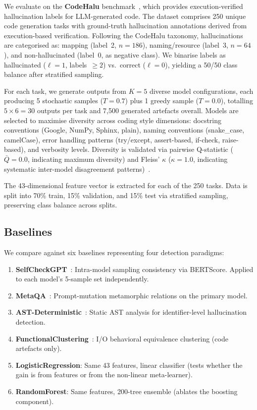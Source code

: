 \documentclass[runningheads]{llncs}
\begin{document}
We evaluate on the \textbf{CodeHalu} benchmark~\cite{tian2025codehalu}, which provides execution-verified hallucination labels for LLM-generated code. The dataset comprises 250 unique code generation tasks with ground-truth hallucination annotations derived from execution-based verification. Following the CodeHalu taxonomy, hallucinations are categorised as: mapping (label~2, $n=186$), naming/resource (label~3, $n=64$), and non-hallucinated (label~0, as negative class). We binarise labels as hallucinated ($\ell=1$, labels~$\geq 2$) vs.\ correct ($\ell=0$), yielding a 50/50 class balance after stratified sampling.

For each task, we generate outputs from $K=5$ diverse model configurations, each producing 5 stochastic samples ($T=0.7$) plus 1 greedy sample ($T=0.0$), totalling $5 \times 6 = 30$ outputs per task and 7,500 generated artefacts overall. Models are selected to maximise diversity across coding style dimensions: docstring conventions (Google, NumPy, Sphinx, plain), naming conventions (snake\_case, camelCase), error handling patterns (try/except, assert-based, if-check, raise-based), and verbosity levels. Diversity is validated via pairwise Q-statistic ($\bar{Q} = 0.0$, indicating maximum diversity) and Fleiss' $\kappa$ ($\kappa = 1.0$, indicating systematic inter-model disagreement patterns)~\cite{brown2005diversity}.

The 43-dimensional feature vector is extracted for each of the 250 tasks. Data is split into 70\% train, 15\% validation, and 15\% test via stratified sampling, preserving class balance across splits.

\subsection{Baselines}
\label{sec:baselines}

We compare against six baselines representing four detection paradigms:
\begin{enumerate}
\item \textbf{SelfCheckGPT}~\cite{manakul2023selfcheckgpt}: Intra-model sampling consistency via BERTScore. Applied to each model's 5-sample set independently.
\item \textbf{MetaQA}~\cite{yang2025metaqa}: Prompt-mutation metamorphic relations on the primary model.
\item \textbf{AST-Deterministic}~\cite{khati2026ast}: Static AST analysis for identifier-level hallucination detection.
\item \textbf{FunctionalClustering}~\cite{ravuri2025clustering}: I/O behavioral equivalence clustering (code artefacts only).
\item \textbf{LogisticRegression}: Same 43 features, linear classifier (tests whether the gain is from features or from the non-linear meta-learner).
\item \textbf{RandomForest}: Same features, 200-tree ensemble (ablates the boosting component).
\end{enumerate}
\end{document}
